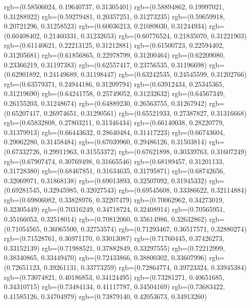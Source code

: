 {{        rgb=(0.58506024, 0.19640737, 0.31305401)
        rgb=(0.58894862, 0.19997021, 0.31288922)
        rgb=(0.59279481, 0.20357251, 0.31273235)
        rgb=(0.59659918, 0.20721296, 0.31258523)
        rgb=(0.60036213, 0.21089030, 0.31244934)
        rgb=(0.60408402, 0.21460331, 0.31232653)
        rgb=(0.60776524, 0.21835070, 0.31221903)
        rgb=(0.61140621, 0.22213125, 0.31212881)
        rgb=(0.61500723, 0.22594402, 0.31205681)
        rgb=(0.61856865, 0.22978799, 0.31200464)
        rgb=(0.62209080, 0.23366219, 0.31197383)
        rgb=(0.62557417, 0.23756535, 0.31196698)
        rgb=(0.62901892, 0.24149689, 0.31198447)
        rgb=(0.63242535, 0.24545599, 0.31202766)
        rgb=(0.63579371, 0.24944186, 0.31209794)
        rgb=(0.63912434, 0.25345365, 0.31219690)
        rgb=(0.64241758, 0.25749052, 0.31232632)
        rgb=(0.64567349, 0.26155203, 0.31248674)
        rgb=(0.64889230, 0.26563755, 0.31267942)
        rgb=(0.65207417, 0.26974651, 0.31290561)
        rgb=(0.65521933, 0.27387827, 0.31316668)
        rgb=(0.65832808, 0.27803211, 0.31346434)
        rgb=(0.66140038, 0.28220779, 0.31379913)
        rgb=(0.66443632, 0.28640484, 0.31417223)
        rgb=(0.66743604, 0.29062280, 0.31458484)
        rgb=(0.67039960, 0.29486126, 0.31503814)
        rgb=(0.67332726, 0.29911963, 0.31553372)
        rgb=(0.67621898, 0.30339763, 0.31607249)
        rgb=(0.67907474, 0.30769498, 0.31665546)
        rgb=(0.68189457, 0.31201133, 0.31728380)
        rgb=(0.68467851, 0.31634635, 0.31795871)
        rgb=(0.68742656, 0.32069971, 0.31868138)
        rgb=(0.69013893, 0.32507092, 0.31945332)
        rgb=(0.69281545, 0.32945985, 0.32027543)
        rgb=(0.69545608, 0.33386622, 0.32114884)
        rgb=(0.69806082, 0.33828976, 0.32207479)
        rgb=(0.70062962, 0.34273019, 0.32305449)
        rgb=(0.70316249, 0.34718724, 0.32408914)
        rgb=(0.70565951, 0.35166053, 0.32518014)
        rgb=(0.70812060, 0.35614986, 0.32632862)
        rgb=(0.71054565, 0.36065500, 0.32753574)
        rgb=(0.71293467, 0.36517571, 0.32880274)
        rgb=(0.71528761, 0.36971170, 0.33013087)
        rgb=(0.71760445, 0.37426273, 0.33152139)
        rgb=(0.71988521, 0.37882849, 0.33297555)
        rgb=(0.72212999, 0.38340865, 0.33449470)
        rgb=(0.72433866, 0.38800302, 0.33607996)
        rgb=(0.72651123, 0.39261131, 0.33773259)
        rgb=(0.72864774, 0.39723324, 0.33945384)
        rgb=(0.73074821, 0.40186853, 0.34124495)
        rgb=(0.73281271, 0.40651685, 0.34310715)
        rgb=(0.73484134, 0.41117787, 0.34504169)
        rgb=(0.73683422, 0.41585126, 0.34704979)
        rgb=(0.73879140, 0.42053673, 0.34913260)
}}

